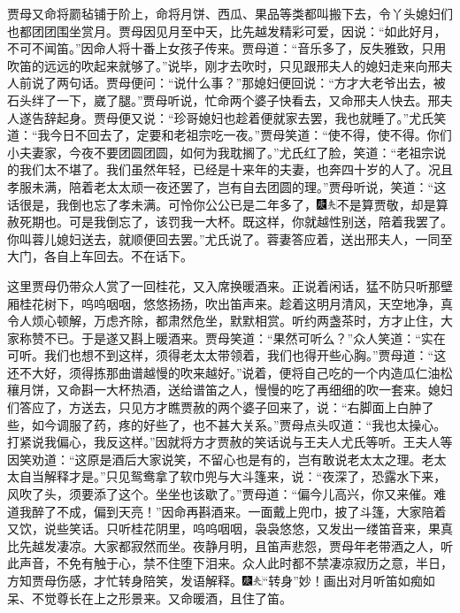 贾母又命将罽毡铺于阶上，命将月饼、西瓜、果品等类都叫搬下去，令丫头媳妇们也都团团围坐赏月。贾母因见月至中天，比先越发精彩可爱，因说：``如此好月，不可不闻笛。''因命人将十番上女孩子传来。贾母道：``音乐多了，反失雅致，只用吹笛的远远的吹起来就够了。''说毕，刚才去吹时，只见跟邢夫人的媳妇走来向邢夫人前说了两句话。贾母便问：``说什么事？''那媳妇便回说：``方才大老爷出去，被石头绊了一下，崴了腿。''贾母听说，忙命两个婆子快看去，又命邢夫人快去。邢夫人遂告辞起身。贾母便又说：``珍哥媳妇也趁着便就家去罢，我也就睡了。''尤氏笑道：``我今日不回去了，定要和老祖宗吃一夜。''贾母笑道：``使不得，使不得。你们小夫妻家，今夜不要团圆团圆，如何为我耽搁了。''尤氏红了脸，笑道：``老祖宗说的我们太不堪了。我们虽然年轻，已经是十来年的夫妻，也奔四十岁的人了。况且孝服未满，陪着老太太顽一夜还罢了，岂有自去团圆的理。''贾母听说，笑道：``这话很是，我倒也忘了孝未满。可怜你公公已是二年多了，{\includegraphics[width=3mm]{../Images/00004}\includegraphics[width=3mm]{../Images/00012}\footnotesize \kaishu 不是算贾敬，却是算赦死期也。}可是我倒忘了，该罚我一大杯。既这样，你就越性别送，陪着我罢了。你叫蓉儿媳妇送去，就顺便回去罢。''尤氏说了。蓉妻答应着，送出邢夫人，一同至大门，各自上车回去。不在话下。

这里贾母仍带众人赏了一回桂花，又入席换暖酒来。正说着闲话，猛不防只听那壁厢桂花树下，呜呜咽咽，悠悠扬扬，吹出笛声来。趁着这明月清风，天空地净，真令人烦心顿解，万虑齐除，都肃然危坐，默默相赏。听约两盏茶时，方才止住，大家称赞不已。于是遂又斟上暖酒来。贾母笑道：``果然可听么？''众人笑道：``实在可听。我们也想不到这样，须得老太太带领着，我们也得开些心胸。''贾母道：``这还不大好，须得拣那曲谱越慢的吹来越好。''说着，便将自己吃的一个内造瓜仁油松穰月饼，又命斟一大杯热酒，送给谱笛之人，慢慢的吃了再细细的吹一套来。媳妇们答应了，方送去，只见方才瞧贾赦的两个婆子回来了，说：``右脚面上白肿了些，如今调服了药，疼的好些了，也不甚大关系。''贾母点头叹道：``我也太操心。打紧说我偏心，我反这样。''因就将方才贾赦的笑话说与王夫人尤氏等听。王夫人等因笑劝道：``这原是酒后大家说笑，不留心也是有的，岂有敢说老太太之理。老太太自当解释才是。''只见鸳鸯拿了软巾兜与大斗篷来，说：``夜深了，恐露水下来，风吹了头，须要添了这个。坐坐也该歇了。''贾母道：``偏今儿高兴，你又来催。难道我醉了不成，偏到天亮！''因命再斟酒来。一面戴上兜巾，披了斗篷，大家陪着又饮，说些笑话。只听桂花阴里，呜呜咽咽，袅袅悠悠，又发出一缕笛音来，果真比先越发凄凉。大家都寂然而坐。夜静月明，且笛声悲怨，贾母年老带酒之人，听此声音，不免有触于心，禁不住堕下泪来。众人此时都不禁凄凉寂历之意，半日，方知贾母伤感，才忙转身陪笑，发语解释。{\includegraphics[width=3mm]{../Images/00004}\includegraphics[width=3mm]{../Images/00012}\footnotesize \kaishu ``转身''妙！画出对月听笛如痴如呆、不觉尊长在上之形景来。}又命暖酒，且住了笛。

